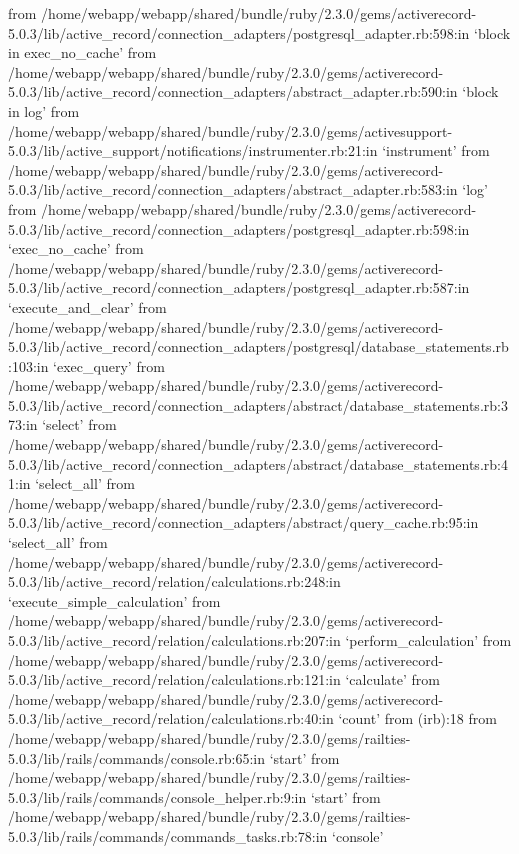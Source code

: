         from /home/webapp/webapp/shared/bundle/ruby/2.3.0/gems/activerecord-5.0.3/lib/active_record/connection_adapters/postgresql_adapter.rb:598:in `block in exec_no_cache'
        from /home/webapp/webapp/shared/bundle/ruby/2.3.0/gems/activerecord-5.0.3/lib/active_record/connection_adapters/abstract_adapter.rb:590:in `block in log'
        from /home/webapp/webapp/shared/bundle/ruby/2.3.0/gems/activesupport-5.0.3/lib/active_support/notifications/instrumenter.rb:21:in `instrument'
        from /home/webapp/webapp/shared/bundle/ruby/2.3.0/gems/activerecord-5.0.3/lib/active_record/connection_adapters/abstract_adapter.rb:583:in `log'
        from /home/webapp/webapp/shared/bundle/ruby/2.3.0/gems/activerecord-5.0.3/lib/active_record/connection_adapters/postgresql_adapter.rb:598:in `exec_no_cache'
        from /home/webapp/webapp/shared/bundle/ruby/2.3.0/gems/activerecord-5.0.3/lib/active_record/connection_adapters/postgresql_adapter.rb:587:in `execute_and_clear'
        from /home/webapp/webapp/shared/bundle/ruby/2.3.0/gems/activerecord-5.0.3/lib/active_record/connection_adapters/postgresql/database_statements.rb:103:in `exec_query'
        from /home/webapp/webapp/shared/bundle/ruby/2.3.0/gems/activerecord-5.0.3/lib/active_record/connection_adapters/abstract/database_statements.rb:373:in `select'
        from /home/webapp/webapp/shared/bundle/ruby/2.3.0/gems/activerecord-5.0.3/lib/active_record/connection_adapters/abstract/database_statements.rb:41:in `select_all'
        from /home/webapp/webapp/shared/bundle/ruby/2.3.0/gems/activerecord-5.0.3/lib/active_record/connection_adapters/abstract/query_cache.rb:95:in `select_all'
        from /home/webapp/webapp/shared/bundle/ruby/2.3.0/gems/activerecord-5.0.3/lib/active_record/relation/calculations.rb:248:in `execute_simple_calculation'
        from /home/webapp/webapp/shared/bundle/ruby/2.3.0/gems/activerecord-5.0.3/lib/active_record/relation/calculations.rb:207:in `perform_calculation'
        from /home/webapp/webapp/shared/bundle/ruby/2.3.0/gems/activerecord-5.0.3/lib/active_record/relation/calculations.rb:121:in `calculate'
        from /home/webapp/webapp/shared/bundle/ruby/2.3.0/gems/activerecord-5.0.3/lib/active_record/relation/calculations.rb:40:in `count'
        from (irb):18
        from /home/webapp/webapp/shared/bundle/ruby/2.3.0/gems/railties-5.0.3/lib/rails/commands/console.rb:65:in `start'
        from /home/webapp/webapp/shared/bundle/ruby/2.3.0/gems/railties-5.0.3/lib/rails/commands/console_helper.rb:9:in `start'
        from /home/webapp/webapp/shared/bundle/ruby/2.3.0/gems/railties-5.0.3/lib/rails/commands/commands_tasks.rb:78:in `console'

